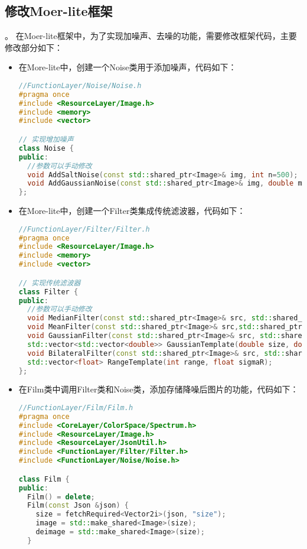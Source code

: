\documentclass[lang=cn,10pt]{elegantbook}
\begin{document}
\subsection{修改Moer-lite框架}\label{sec:modify-moer-lite}。%
在Moer-lite框架中，为了实现加噪声、去噪的功能，需要修改框架代码，主要修改部分如下：
\begin{itemize}
\item 在More-lite中，创建一个Noise类用于添加噪声，代码如下： 
\begin{lstlisting}[language=c++]
//FunctionLayer/Noise/Noise.h
#pragma once
#include <ResourceLayer/Image.h>
#include <memory>
#include <vector>

// 实现增加噪声
class Noise {
public:
  //参数可以手动修改
  void AddSaltNoise(const std::shared_ptr<Image>& img, int n=500);
  void AddGaussianNoise(const std::shared_ptr<Image>& img, double mu=0, double sigma=25);
};
\end{lstlisting}

\item 在More-lite中，创建一个Filter类集成传统滤波器，代码如下： 
\begin{lstlisting}[language=c++]
//FunctionLayer/Filter/Filter.h
#pragma once
#include <ResourceLayer/Image.h>
#include <memory>
#include <vector>

// 实现传统滤波器
class Filter {
public:
  //参数可以手动修改
  void MedianFilter(const std::shared_ptr<Image>& src, std::shared_ptr<Image>& dst,double size=3);
  void MeanFilter(const std::shared_ptr<Image>& src,std::shared_ptr<Image>& dst,double size=3);
  void GaussianFilter(const std::shared_ptr<Image>& src, std::shared_ptr<Image>& dst,double size=23, double sigma=0.8);
  std::vector<std::vector<double>> GaussianTemplate(double size, double sigma);
  void BilateralFilter(const std::shared_ptr<Image>& src, std::shared_ptr<Image>& dst, int size=3, float sigmaD=10, float sigmaR=35);
  std::vector<float> RangeTemplate(int range, float sigmaR);
};
\end{lstlisting}

\item 在Film类中调用Filter类和Noise类，添加存储降噪后图片的功能，代码如下：
\begin{lstlisting}[language=c++]
//FunctionLayer/Film/Film.h
#pragma once
#include <CoreLayer/ColorSpace/Spectrum.h>
#include <ResourceLayer/Image.h>
#include <ResourceLayer/JsonUtil.h>
#include <FunctionLayer/Filter/Filter.h>
#include <FunctionLayer/Noise/Noise.h>

class Film {
public:
  Film() = delete;
  Film(const Json &json) {
    size = fetchRequired<Vector2i>(json, "size");
    image = std::make_shared<Image>(size);
    deimage = std::make_shared<Image>(size);
  }


\end{lstlisting}
\end{itemize}
\end{document}
